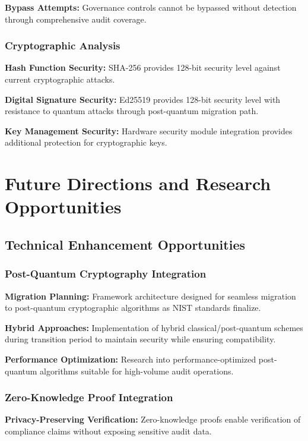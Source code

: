 \documentclass[12pt,a4paper]{article}
\begin{document}
\textbf{Bypass Attempts:} Governance controls cannot be bypassed without detection through comprehensive audit coverage.

\subsubsection{Cryptographic Analysis}

\textbf{Hash Function Security:} SHA-256 provides 128-bit security level against current cryptographic attacks.

\textbf{Digital Signature Security:} Ed25519 provides 128-bit security level with resistance to quantum attacks through post-quantum migration path.

\textbf{Key Management Security:} Hardware security module integration provides additional protection for cryptographic keys.

\section{Future Directions and Research Opportunities}

\subsection{Technical Enhancement Opportunities}

\subsubsection{Post-Quantum Cryptography Integration}

\textbf{Migration Planning:} Framework architecture designed for seamless migration to post-quantum cryptographic algorithms as NIST standards finalize.

\textbf{Hybrid Approaches:} Implementation of hybrid classical/post-quantum schemes during transition period to maintain security while ensuring compatibility.

\textbf{Performance Optimization:} Research into performance-optimized post-quantum algorithms suitable for high-volume audit operations.

\subsubsection{Zero-Knowledge Proof Integration}

\textbf{Privacy-Preserving Verification:} Zero-knowledge proofs enable verification of compliance claims without exposing sensitive audit data.
\end{document}
